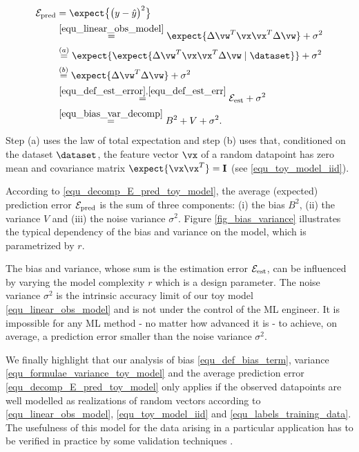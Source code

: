 \documentclass[12pt]{report}
\begin{document}
\begin{align} 
\label{equ_decomp_E_pred_toy_model}
\mathcal{E}_{\rm pred} & = \expect \big\{ \big( y - \hat{y} \big)^2 \big\} \nonumber \\
& \stackrel{\eqref{equ_linear_obs_model}}{=} \expect \{ \Delta \vw^{T} \vx \vx^{T} \Delta \vw \} + \sigma^{2}   \nonumber \\
& \stackrel{(a)}{=} \expect \{ \expect \{ \Delta \vw^{T} \vx \vx^{T} \Delta \vw \mid \dataset \} \} + \sigma^{2}  \nonumber \\
& \stackrel{(b)}{=} \expect \{ \Delta \vw^{T} \Delta \vw \}  + \sigma^{2}  \nonumber \\
& \stackrel{\eqref{equ_def_est_error},\eqref{equ_def_est_err}}{=} \mathcal{E}_{\rm est} + \sigma^{2} \nonumber \\
& \stackrel{\eqref{equ_bias_var_decomp}}{=} B^{2} + V + \sigma^{2}. 
\end{align} 
Step (a) uses the law of total expectation \cite{BillingsleyProbMeasure} and 
step (b) uses that, conditioned on the dataset $\dataset$, the feature vector 
$\vx$ of a random datapoint has zero mean and covariance matrix $\expect \{ \vx \vx^{T}\}=\mathbf{I}$ (see \eqref{equ_toy_model_iid}). 

According to \eqref{equ_decomp_E_pred_toy_model}, the average (expected) 
prediction error $\mathcal{E}_{\rm pred}$ is the sum of three components: (i) 
the bias $B^{2}$, (ii) the variance $V$ and (iii) the noise variance $\sigma^{2}$. 
Figure \ref{fig_bias_variance} illustrates the typical dependency of the bias and 
variance on the model, which is parametrized by $r$. 

The bias and variance, whose sum is the estimation error $\mathcal{E}_{\rm est}$, 
can be influenced by varying the model complexity $r$ which is a design parameter. 
The noise variance $\sigma^{2}$ is the intrinsic accuracy limit of our toy model \eqref{equ_linear_obs_model} 
and is not under the control of the ML engineer. It is impossible for 
any ML method - no matter how advanced it is - to achieve, 
on average, a prediction error smaller than the noise variance $\sigma^{2}$. 

We finally highlight that our analysis of bias \eqref{equ_def_bias_term}, 
variance \eqref{equ_formulae_variance_toy_model} and the average prediction 
error \eqref{equ_decomp_E_pred_toy_model} only applies if the observed 
datapoints are well modelled as realizations of random vectors according 
to \eqref{equ_linear_obs_model}, \eqref{equ_toy_model_iid} and \eqref{equ_labels_training_data}. 
The usefulness of this model for the data arising in a particular application 
has to be verified in practice by some validation techniques \cite{Young93,Vasicek76}. 
\end{document}
